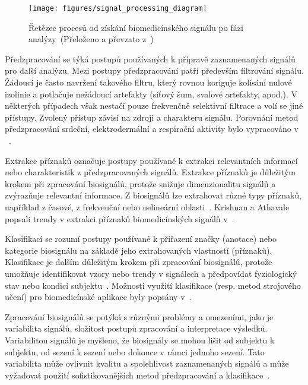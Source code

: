 \begin{figure}[htb!]
    \begin{center}
        \texttt{[image: figures/signal\_processing\_diagram]}
        \caption{Řetězec procesů od získání biomedicínského signálu po fázi
        analýzy~(Přeloženo a převzato z~\cite{Karagiannis2011})}
        \label{fig:zpracovani_biosignalu_diagram}
    \end{center}
\end{figure}

Předzpracování se týká postupů používaných k přípravě zaznamenaných signálů pro
další analýzu. Mezi postupy předzpracování patří především filtrování signálu.
Žádoucí je často navržení takového filtru, který rovnou koriguje kolísání nulové
izolinie a potlačuje nežádoucí artefakty (síťový šum, svalové artefakty, apod.).
V některých případech však nestačí pouze frekvenčně selektivní filtrace a volí
se jiné přístupy. Zvolený přístup závisí na zdroji a charakteru signálu.
Porovnání metod předzpracování srdeční, elektrodermální a respirační aktivity
bylo vypracováno v ~\cite{Escabi2005,Khodadad2018,Power2020,Subramanian2019}. 

Extrakce příznaků označuje postupy používané k extrakci relevantních informací
nebo charakteristik z předzpracovaných signálů. Extrakce příznaků je důležitým
krokem při zpracování biosignálů, protože snižuje dimenzionalitu signálů a
zvýrazňuje relevantní informace. Z biosignálů lze extrahovat různé typy
příznaků, například z časové, z frekvenční nebo nelineární
oblasti~\cite{Escabi2005,Karagiannis2011}. Krishnan a Athavale popsali trendy v
extrakci příznaků biomedicínských signálů v~\cite{Krishnan2018}.

Klasifikací se rozumí postupy používané k přiřazení značky (anotace) nebo
kategorie biosignálu na základě jeho extrahovaných vlastností (příznaků).
Klasifikace je dalším důležitým krokem při zpracování biosignálů, protože
umožňuje identifikovat vzory nebo trendy v signálech a předpovídat fyziologický
stav nebo kondici subjektu~\cite{Escabi2005,Karagiannis2011}. Možnosti využití
klasifikace (resp. metod strojového učení) pro biomedicínské aplikace byly
popsány v~\cite{Foster2014,Kording2018,Strzelecki2022}.

Zpracování biosignálů se potýká s různými problémy a omezeními, jako je
variabilita signálů, složitost postupů zpracování a interpretace výsledků.
Variabilitou signálů je myšleno, že biosignály se mohou lišit od subjektu k
subjektu, od sezení k sezení nebo dokonce v rámci jednoho sezení. Tato
variabilita může ovlivnit kvalitu a spolehlivost zaznamenaných signálů a může
vyžadovat použití sofistikovanějších metod předzpracování a
klasifikace~\cite{Escabi2005,Karagiannis2011}.